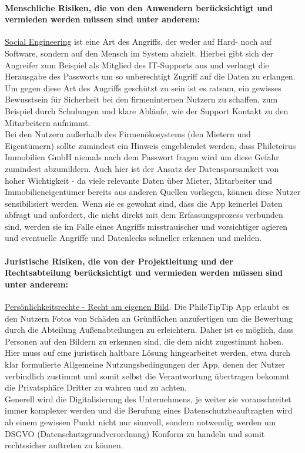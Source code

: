 \paragraph{Menschliche Risiken, die von den Anwendern berücksichtigt und vermieden werden müssen sind unter anderem:}

\underline{Social Engineering} ist eine Art des Angriffs, der weder auf Hard- noch auf Software, sondern auf den Mensch im System abzielt. Hierbei gibt sich der Angreifer zum Beispiel als Mitglied des IT-Supports aus und verlangt die Herausgabe des Passworts um so unberechtigt Zugriff auf die Daten zu erlangen. Um gegen diese Art des Angriffs geschützt zu sein ist es ratsam, ein gewisses Bewusstsein für Sicherheit bei den firmeninternen Nutzern zu schaffen, zum Beispiel durch Schulungen und klare Abläufe, wie der Support Kontakt zu den Mitarbeitern aufnimmt.\\

Bei den Nutzern außerhalb des Firmenökosystems (den Mietern und Eigentümern) sollte zumindest ein Hinweis eingeblendet werden, dass Phileteirus Immobilien GmbH niemals nach dem Passwort fragen wird um diese Gefahr zumindest abzumildern. Auch hier ist der Ansatz der Datensparsamkeit von hoher Wichtigkeit - da viele relevante Daten über Mieter, Mitarbeiter und Immobilieneigentümer bereits aus anderen Quellen vorliegen, können diese Nutzer sensibilisiert werden. Wenn sie es gewohnt sind, dass die App keinerlei Daten abfragt und anfordert, die nicht direkt mit dem Erfassungsprozess verbunden sind, werden sie im Falle eines Angriffs misstrauischer und vorsichtiger agieren und eventuelle Angriffe und Datenlecks schneller erkennen und melden.\\

\paragraph{Juristische Risiken, die von der Projektleitung und der Rechtsabteilung berücksichtigt und vermieden werden müssen sind unter anderem:}

\underline{Persönlichkeitsrechte - Recht am eigenen Bild}. Die PhileTipTip App erlaubt es den Nutzern Fotos von Schäden an Grünflächen anzufertigen um die Bewertung durch die Abteilung Außenabteilungen zu erleichtern. Daher ist es möglich, dass Personen auf den Bildern zu erkennen sind, die dem nicht zugestimmt haben. Hier muss auf eine juristisch haltbare Lösung hingearbeitet werden, etwa durch klar formulierte Allgemeine Nutzungsbedingungen der App, denen der Nutzer verbindlich zustimmt und somit selbst die Verantwortung übertragen bekommt die Privatsphäre Dritter zu wahren und zu achten.\\

Generell wird die Digitalisierung des Unternehmens, je weiter sie voranschreitet immer komplexer werden und die Berufung eines Datenschutzbeauftragten wird ab einem gewissen Punkt nicht nur sinnvoll, sondern notwendig werden um DSGVO (Datenschutzgrundverordnung) Konform zu handeln und somit rechtssicher auftreten zu können.